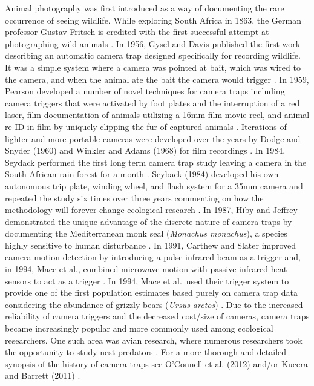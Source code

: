 \documentclass[11pt]{article}
\begin{document}
Animal photography was first introduced as a way of documenting the rare occurrence of seeing wildlife. While exploring South Africa in 1863, the German professor Gustav Fritsch is credited with the first successful attempt at photographing wild animals \cite{guggisberg1977early, kucera2011history}. In 1956, Gysel and Davis published the first work describing an automatic camera trap designed specifically for recording wildlife. It was a simple system where a camera was pointed at bait, which was wired to the camera, and when the animal ate the bait the camera would trigger \cite{gysel1956simple}. In 1959, Pearson developed a number of novel techniques for camera traps including camera triggers that were activated by foot plates and the interruption of a red laser, film documentation of animals utilizing a 16mm film movie reel, and animal re-ID in film by uniquely clipping the fur of captured animals \cite{pearson1959traffic}. Iterations of lighter and more portable cameras were developed over the years by Dodge and Snyder (1960) and Winkler and Adams (1968) for film recordings \cite{dodge1960automatic, winkler1968automatic}. In 1984, Seydack performed the first long term camera trap study leaving a camera in the South African rain forest for a month \cite{seydack1984application}. Seyback (1984) developed his own autonomous trip plate, winding wheel, and flash system for a 35mm camera and repeated the study six times over three years commenting on how the methodology will forever change ecological research \cite{seydack1984application}. In 1987, Hiby and Jeffrey demonstrated the unique advantage of the discrete nature of camera traps by documenting the Mediterranean monk seal (\textit{Monachus monachus}), a species highly sensitive to human disturbance \cite{hiby1987census}. In 1991, Carthew and Slater improved camera motion detection by introducing a pulse infrared beam as a trigger and, in 1994, Mace et al., combined microwave motion with passive infrared heat sensors to act as a trigger \cite{carthew1991monitoring, mace1994estimating}. In 1994, Mace et al.\ used their trigger system to provide one of the first population estimates based purely on camera trap data considering the abundance of grizzly bears (\textit{Ursus arctos}) \cite{mace1994estimating}. Due to the increased reliability of camera triggers and the decreased cost/size of cameras, camera traps became increasingly popular and more commonly used among ecological researchers. One such area was avian research, where numerous researchers took the opportunity to study nest predators \cite{laurance1994photographic, major1994inexpensive, leimgruber1994predation, danielson1996inexpensive} . For a more thorough and detailed synopsis of the history of camera traps see O'Connell et al. (2012) and/or Kucera and Barrett (2011) \cite{kucera2011history, o2010camera}. 
\end{document}
